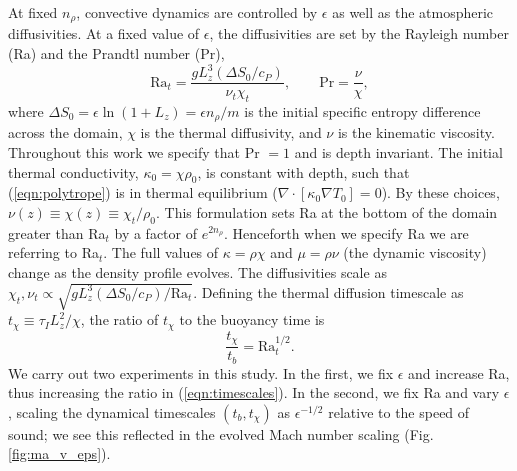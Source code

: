 \documentclass[aps, pre, onecolumn, nofootinbib, notitlepage, groupedaddress, amsfonts, amssymb, amsmath, longbibliography]{revtex4-1}
\newcommand{\grad}{\ensuremath{\nabla}}
\begin{document}
At fixed $n_\rho$, convective dynamics are 
controlled by $\epsilon$ as well as the atmospheric diffusivities.
At a fixed value of
$\epsilon$, the diffusivities are set by the
Rayleigh number (Ra) and the Prandtl number (Pr),
\begin{equation}
\text{Ra}_{t} = \frac{g L_z^3 (\Delta S_0 / c_P)}{\nu_t\chi_t},
\qquad
\text{Pr} = \frac{\nu}{\chi},
\end{equation}
where $\Delta S_0 = \epsilon\ln (1 + L_z) = \epsilon n_\rho / m$ 
is the initial specific entropy difference across the domain,
$\chi$ is the thermal diffusivity, 
and $\nu$ is the kinematic viscosity.
Throughout this work we specify
that Pr $= 1$ and is depth invariant.
The initial thermal
conductivity, $\kappa_0 = \chi \rho_0$, is
constant with depth, such that (\ref{eqn:polytrope}) is in
thermal equilibrium ($\grad\cdot[\kappa_0\grad T_0] = 0$).
By these
choices, $\nu(z) \equiv \chi(z) \equiv \chi_t / \rho_0$.
This formulation 
sets Ra at the bottom of the domain greater than
Ra$_t$ by a factor of $e^{2n_\rho}$. Henceforth
when we specify Ra we are referring to Ra$_t$.  
The full values of $\kappa = \rho\chi$ and 
$\mu = \rho\nu$ (the dynamic viscosity) change as the density 
profile evolves.  
The diffusivities scale as
$\chi_t, \nu_t \propto \sqrt{g L_z^3 (\Delta S_0 / c_P) / \text{Ra}_t}$.
Defining the thermal diffusion timescale as $t_\chi \equiv \tau_IL_z^2 / \chi$, the
ratio of $t_\chi$ to the buoyancy time is
\begin{equation}
\frac{t_\chi}{t_b} =\text{Ra}_t^{1/2}.
\label{eqn:timescales}
\end{equation}
We carry out two experiments in this study. In the first,
we fix $\epsilon$ and increase Ra, thus increasing the ratio in
(\ref{eqn:timescales}). In the second, we fix Ra and vary $\epsilon$,
scaling the dynamical timescales $(t_b, t_\chi)$ as $\epsilon^{-1/2}$
relative to the speed of sound; we see this reflected in the evolved Mach
number scaling (Fig. \ref{fig:ma_v_eps}).
\end{document}
